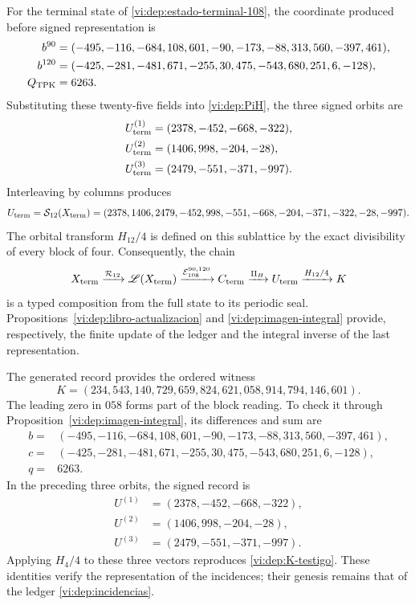 For the terminal state of \eqref{vi:dep:estado-terminal-108}, the coordinate
produced before signed representation is
\begin{align}
 b^{90}={}&(-495,-116,-684,108,601,-90,
              -173,-88,313,560,-397,461),\notag\\
 b^{120}={}&(-425,-281,-481,671,-255,30,
               475,-543,680,251,6,-128),\notag\\
 Q_{\rm TPK}={}&6263.
 \label{vi:dep:canales-terminales}
\end{align}
Substituting these twenty-five fields into \eqref{vi:dep:PiH}, the three
signed orbits are
\begin{align*}
 U_{\rm term}^{(1)}&=(2378,-452,-668,-322),\\
 U_{\rm term}^{(2)}&=(1406,998,-204,-28),\\
 U_{\rm term}^{(3)}&=(2479,-551,-371,-997).
\end{align*}
Interleaving by columns produces
\begin{equation}
 U_{\rm term}=\mathcal S_{12}(X_{\rm term})
 =(2378,1406,2479,-452,998,-551,-668,-204,-371,-322,-28,-997).
 \label{vi:dep:U-terminal}
\end{equation}
The orbital transform \(H_{12}/4\) is defined on this sublattice by
the exact divisibility of every block of four. Consequently, the chain
\begin{equation}
 X_{\rm term}\xrightarrow{\mathcal R_{12}}\mathscr L(X_{\rm term})
 \xrightarrow{\mathcal E_{108}^{90,120}}C_{\rm term}
 \xrightarrow{\Pi_H}U_{\rm term}
 \xrightarrow{H_{12}/4}K
 \label{vi:dep:cadena-terminal-completa}
\end{equation}
is a typed composition from the full state to its periodic seal.
Propositions~\ref{vi:dep:libro-actualizacion} and
\ref{vi:dep:imagen-integral} provide, respectively, the finite update
of the ledger and the integral inverse of the last representation.

The generated record provides the ordered witness
\begin{equation}
 K=(234,543,140,729,659,824,621,058,914,794,146,601).
 \label{vi:dep:K-testigo}
\end{equation}
The leading zero in \(058\) forms part of the block reading.
To check it through Proposition~\ref{vi:dep:imagen-integral}, its differences
and sum are
\[
\begin{split}
b={}&(-495,-116,-684,108,601,-90,-173,-88,313,560,-397,461),\\
c={}&(-425,-281,-481,671,-255,30,475,-543,680,251,6,-128),\\
q={}&6263.
\end{split}
\]
In the preceding three orbits, the signed record is
\[
 \begin{aligned}
 U^{(1)}&=(2378,-452,-668,-322),\\
 U^{(2)}&=(1406,998,-204,-28),\\
 U^{(3)}&=(2479,-551,-371,-997).
 \end{aligned}
\]
Applying \(H_4/4\) to these three vectors reproduces
\eqref{vi:dep:K-testigo}. These identities verify the representation of
the incidences; their genesis remains that of the ledger
\eqref{vi:dep:incidencias}.


